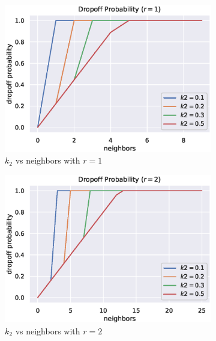 \documentclass[12pt]{article}
\begin{document}
\begin{figure}[H]
    \begin{subfigure}[b]{0.32\textwidth}
        \centering
        \includegraphics[width=\textwidth]{figures/aca/k2-r1.eps}
        \caption{$k_2$ vs neighbors with $r=1$}
    \end{subfigure}%
    \begin{subfigure}[b]{0.32\textwidth}
        \centering
        \includegraphics[width=\textwidth]{figures/aca/k2-r2.eps}
        \caption{$k_2$ vs neighbors with $r=2$}
    \end{subfigure}%
    \begin{subfigure}[b]{0.32\textwidth}
        \centering

\end{subfigure}
\end{figure}
\end{document}
